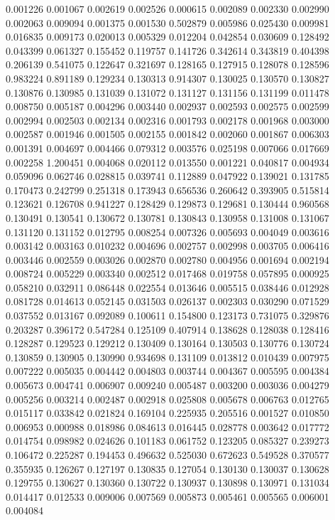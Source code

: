 0.001226
0.001067
0.002619
0.002526
0.000615
0.002089
0.002330
0.002990
0.002063
0.009094
0.001375
0.001530
0.502879
0.005986
0.025430
0.009981
0.016835
0.009173
0.020013
0.005329
0.012204
0.042854
0.030609
0.128492
0.043399
0.061327
0.155452
0.119757
0.141726
0.342614
0.343819
0.404398
0.206139
0.541075
0.122647
0.321697
0.128165
0.127915
0.128078
0.128596
0.983224
0.891189
0.129234
0.130313
0.914307
0.130025
0.130570
0.130827
0.130876
0.130985
0.131039
0.131072
0.131127
0.131156
0.131199
0.011478
0.008750
0.005187
0.004296
0.003440
0.002937
0.002593
0.002575
0.002599
0.002994
0.002503
0.002134
0.002316
0.001793
0.002178
0.001968
0.003000
0.002587
0.001946
0.001505
0.002155
0.001842
0.002060
0.001867
0.006303
0.001391
0.004697
0.004466
0.079312
0.003576
0.025198
0.007066
0.017669
0.002258
1.200451
0.004068
0.020112
0.013550
0.001221
0.040817
0.004934
0.059096
0.062746
0.028815
0.039741
0.112889
0.047922
0.139021
0.131785
0.170473
0.242799
0.251318
0.173943
0.656536
0.260642
0.393905
0.515814
0.123621
0.126708
0.941227
0.128429
0.129873
0.129681
0.130444
0.960568
0.130491
0.130541
0.130672
0.130781
0.130843
0.130958
0.131008
0.131067
0.131120
0.131152
0.012795
0.008254
0.007326
0.005693
0.004049
0.003616
0.003142
0.003163
0.010232
0.004696
0.002757
0.002998
0.003705
0.006416
0.003446
0.002559
0.003026
0.002870
0.002780
0.004956
0.001694
0.002194
0.008724
0.005229
0.003340
0.002512
0.017468
0.019758
0.057895
0.000925
0.058210
0.032911
0.086448
0.022554
0.013646
0.005515
0.038446
0.012928
0.081728
0.014613
0.052145
0.031503
0.026137
0.002303
0.030290
0.071529
0.037552
0.013167
0.092089
0.100611
0.154800
0.123173
0.731075
0.329876
0.203287
0.396172
0.547284
0.125109
0.407914
0.138628
0.128038
0.128416
0.128287
0.129523
0.129212
0.130409
0.130164
0.130503
0.130776
0.130724
0.130859
0.130905
0.130990
0.934698
0.131109
0.013812
0.010439
0.007975
0.007222
0.005035
0.004442
0.004803
0.003744
0.004367
0.005595
0.004384
0.005673
0.004741
0.006907
0.009240
0.005487
0.003200
0.003036
0.004279
0.005256
0.003214
0.002487
0.002918
0.025808
0.005678
0.006763
0.012765
0.015117
0.033842
0.021824
0.169104
0.225935
0.205516
0.001527
0.010850
0.006953
0.000988
0.018986
0.084613
0.016445
0.028778
0.003642
0.017772
0.014754
0.098982
0.024626
0.101183
0.061752
0.123205
0.085327
0.239273
0.106472
0.225287
0.194453
0.496632
0.525030
0.672623
0.549528
0.370577
0.355935
0.126267
0.127197
0.130835
0.127054
0.130130
0.130037
0.130628
0.129755
0.130627
0.130360
0.130722
0.130937
0.130898
0.130971
0.131034
0.014417
0.012533
0.009006
0.007569
0.005873
0.005461
0.005565
0.006001
0.004084
